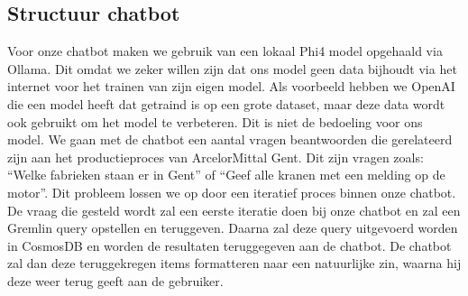 \subsection{Structuur chatbot}
Voor onze chatbot maken we gebruik van een lokaal Phi4 model opgehaald via Ollama. Dit omdat we zeker willen zijn dat ons model geen data bijhoudt via het internet voor het trainen van zijn eigen model.
Als voorbeeld hebben we OpenAI die een model heeft dat getraind is op een grote dataset, maar deze data wordt ook gebruikt om het model te verbeteren. Dit is niet de bedoeling voor ons model.
We gaan met de chatbot een aantal vragen beantwoorden die gerelateerd zijn aan het productieproces van ArcelorMittal Gent. Dit zijn vragen zoals: ``Welke fabrieken staan er in Gent'' of ``Geef alle kranen met een melding op de motor''.
Dit probleem lossen we op door een iteratief proces binnen onze chatbot. De vraag die gesteld wordt zal een eerste iteratie doen bij onze chatbot en zal een Gremlin query opstellen en teruggeven. 
Daarna zal deze query uitgevoerd worden in CosmosDB en worden de resultaten teruggegeven aan de chatbot. De chatbot zal dan deze teruggekregen items formatteren naar een natuurlijke zin, waarna hij deze weer terug geeft aan de gebruiker.



